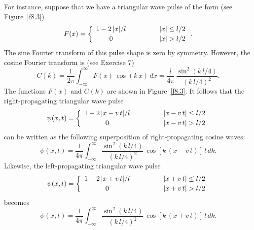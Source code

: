 For instance, suppose that we have a triangular wave pulse of the form (see Figure~\ref{f8.3})
\begin{equation}
F(x) = \left\{
\begin{array}{ccc}
1 -2\,|x|/l&\mbox{\hspace{1cm}}& |x|\leq l/2\\[0.5ex]
0 &&|x|>l/2
\end{array}\right..
\end{equation}
The sine Fourier transform of this pulse shape is zero by symmetry. However, the
cosine Fourier transform is (see Exercise 7)
\begin{equation}\label{e8.49}
C(k)=\frac{1}{2\pi}\int_{-\infty}^\infty F(x)\,\cos(k\,x)\,dx = \frac{l}{4\pi}\,\frac{\sin^2(k\,l/4)}{(k\,l/4)^2}.
\end{equation}
The functions $F(x)$ and $C(k)$ are shown in Figure~\ref{f8.3}. 
It follows that the right-propagating triangular wave pulse
\begin{equation}
\psi(x,t)= \left\{
\begin{array}{ccc}
1 -2\,|x-v\,t|/l&\mbox{\hspace{1cm}}& |x-v\,t|\leq l/2\\[0.5ex]
0 &&|x-v\,t|>l/2
\end{array}\right.
\end{equation}
can be written as the following superposition of right-propagating cosine waves:
\begin{equation}
\psi(x,t) =\frac{1}{4\pi} \int_{-\infty}^\infty \frac{\sin^2(k\,l/4)}{(k\,l/4)^2}\,\cos[k\,(x-v\,t)]\,l\,dk.
\end{equation}
Likewise, the left-propagating triangular wave pulse
\begin{equation}
\psi(x,t)= \left\{
\begin{array}{ccc}
1 -2\,|x+v\,t|/l&\mbox{\hspace{1cm}}& |x+v\,t|\leq l/2\\[0.5ex]
0 &&|x+v\,t|>l/2
\end{array}\right.
\end{equation}
becomes
\begin{equation}
\psi(x,t) =\frac{1}{4\pi} \int_{-\infty}^\infty \frac{\sin^2(k\,l/4)}{(k\,l/4)^2}\,\cos[k\,(x+v\,t)]\,l\,dk.
\end{equation}

